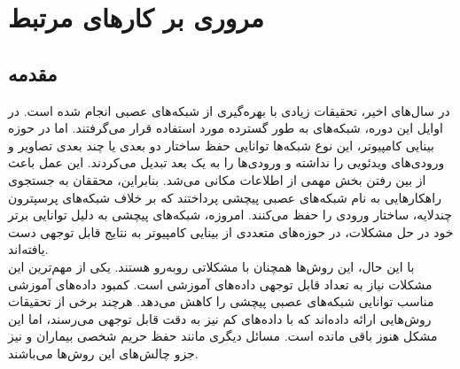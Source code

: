 \chapter{مروری بر کارهای مرتبط}
\thispagestyle{empty}

\section{مقدمه}
در سال‌های اخیر، تحقیقات زیادی با بهره‌گیری از شبکه‌های عصبی انجام شده است. در اوایل این دوره، شبکه‌های  به طور گسترده مورد استفاده قرار می‌گرفتند. اما در حوزه بینایی کامپیوتر، این نوع شبکه‌ها توانایی حفظ ساختار دو بعدی یا چند بعدی تصاویر و ورودی‌های ویدئویی را نداشته و ورودی‌ها را به یک بعد تبدیل می‌کردند. این عمل باعث از بین رفتن بخش مهمی از اطلاعات مکانی می‌شد. بنابراین، محققان به جستجوی راهکارهایی به نام شبکه‌های عصبی پیچشی پرداختند که بر خلاف شبکه‌های پرسپترون چندلایه، ساختار ورودی را حفظ می‌کنند. امروزه، شبکه‌های پیچشی به دلیل توانایی برتر خود در حل مشکلات، در حوزه‌های متعددی از بینایی کامپیوتر به نتایج قابل توجهی دست یافته‌اند.
\\
با این حال، این روش‌ها همچنان با مشکلاتی روبه‌رو هستند. یکی از مهم‌ترین این مشکلات نیاز به تعداد قابل توجهی داده‌های آموزشی است. کمبود داده‌های آموزشی مناسب توانایی شبکه‌های عصبی پیچشی را کاهش می‌دهد. هرچند برخی از تحقیقات روش‌هایی ارائه داده‌اند که با داده‌های کم نیز به دقت قابل توجهی می‌رسند، اما این مشکل هنوز باقی مانده است. مسائل دیگری مانند حفظ حریم شخصی بیماران و  نیز جزو چالش‌های این روش‌ها می‌باشند\cite{biratu2021survey}.

